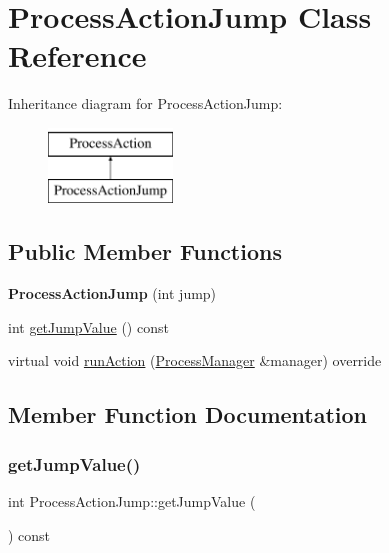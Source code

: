 \hypertarget{classProcessActionJump}{}\section{Process\+Action\+Jump Class Reference}
\label{classProcessActionJump}
Inheritance diagram for Process\+Action\+Jump\+:\begin{figure}[H]
\begin{center}
\leavevmode
\includegraphics[height=2.000000cm]{classProcessActionJump}
\end{center}
\end{figure}
\subsection*{Public Member Functions}
\begin{DoxyCompactItemize}
\item 
\mbox{\label{classProcessActionJump_ab2d4c7e11b65b3010cb7be96c454820b}} 
{\bfseries Process\+Action\+Jump} (int jump)
\item 
int \hyperlink{classProcessActionJump_a196bb3613ab7a51d2ff07edf757a8d6a}{get\+Jump\+Value} () const
\item 
virtual void \hyperlink{classProcessActionJump_a655f264451f08675b094a38fcb540155}{run\+Action} (\hyperlink{classProcessManager}{Process\+Manager} \&manager) override
\end{DoxyCompactItemize}


\subsection{Member Function Documentation}
\mbox{\label{classProcessActionJump_a196bb3613ab7a51d2ff07edf757a8d6a}} 
\subsubsection{\texorpdfstring{get\+Jump\+Value()}{getJumpValue()}}
{\footnotesize\ttfamily int Process\+Action\+Jump\+::get\+Jump\+Value (\begin{DoxyParamCaption}{ }\end{DoxyParamCaption}) const}

